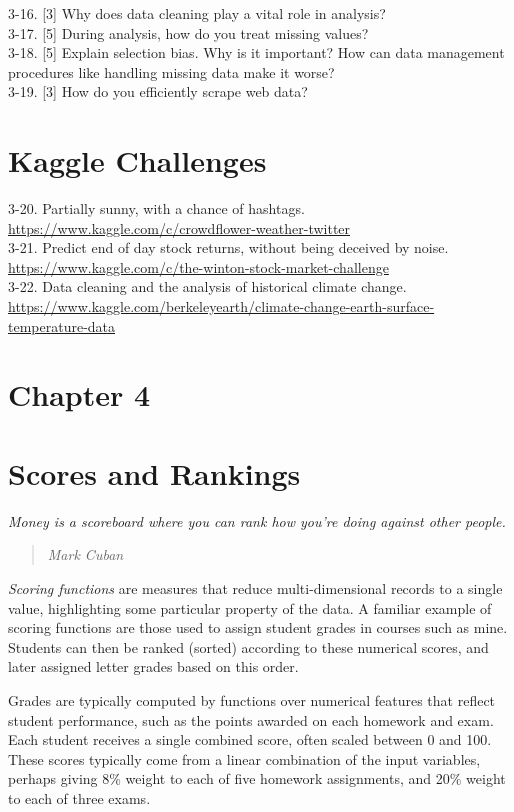 \documentclass[10pt]{article}
\begin{document}
3-16. [3] Why does data cleaning play a vital role in analysis?\\

3-17. [5] During analysis, how do you treat missing values?\\
3-18. [5] Explain selection bias. Why is it important? How can data management procedures like handling missing data make it worse?\\
3-19. [3] How do you efficiently scrape web data?

\section*{Kaggle Challenges}
3-20. Partially sunny, with a chance of hashtags. \url{https://www.kaggle.com/c/crowdflower-weather-twitter}\\
3-21. Predict end of day stock returns, without being deceived by noise. \url{https://www.kaggle.com/c/the-winton-stock-market-challenge}\\
3-22. Data cleaning and the analysis of historical climate change. \url{https://www.kaggle.com/berkeleyearth/climate-change-earth-surface-temperature-data}

\section*{Chapter 4}
\section*{Scores and Rankings}
\textit{Money is a scoreboard where you can rank how you're doing against other people.}

\begin{quote}
  \item \textit{Mark Cuban}
\end{quote}

\textit{Scoring functions} are measures that reduce multi-dimensional records to a single value, highlighting some particular property of the data. A familiar example of scoring functions are those used to assign student grades in courses such as mine. Students can then be ranked (sorted) according to these numerical scores, and later assigned letter grades based on this order.

Grades are typically computed by functions over numerical features that reflect student performance, such as the points awarded on each homework and exam. Each student receives a single combined score, often scaled between 0 and 100. These scores typically come from a linear combination of the input variables, perhaps giving 8\% weight to each of five homework assignments, and 20\% weight to each of three exams.
\end{document}
